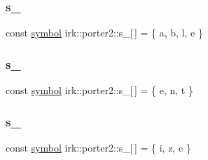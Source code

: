 \mbox{\label{namespaceirk_1_1porter2_ae821034253ce99b614b3e2331a262480}} 
\subsubsection{\texorpdfstring{s\+\_}{s\_12}}
{\footnotesize\ttfamily const \mbox{\hyperlink{namespaceirk_1_1porter2_afd04c4eb58a1dabcf8f3ab2d7e9f9ed5}{symbol}} irk\+::porter2\+::s\+\_\mbox{[}$\,$\mbox{]} = \{ \textquotesingle{}a\textquotesingle{}, \textquotesingle{}b\textquotesingle{}, \textquotesingle{}l\textquotesingle{}, \textquotesingle{}e\textquotesingle{} \}\hspace{0.3cm}{\ttfamily [static]}}

\mbox{\label{namespaceirk_1_1porter2_ae01b59f238865d32969dfe5b7e86d337}} 
\subsubsection{\texorpdfstring{s\+\_}{s\_13}}
{\footnotesize\ttfamily const \mbox{\hyperlink{namespaceirk_1_1porter2_afd04c4eb58a1dabcf8f3ab2d7e9f9ed5}{symbol}} irk\+::porter2\+::s\+\_\mbox{[}$\,$\mbox{]} = \{ \textquotesingle{}e\textquotesingle{}, \textquotesingle{}n\textquotesingle{}, \textquotesingle{}t\textquotesingle{} \}\hspace{0.3cm}{\ttfamily [static]}}

\mbox{\label{namespaceirk_1_1porter2_a492c21408fc2183e9836d76737c56405}} 
\subsubsection{\texorpdfstring{s\+\_}{s\_14}}
{\footnotesize\ttfamily const \mbox{\hyperlink{namespaceirk_1_1porter2_afd04c4eb58a1dabcf8f3ab2d7e9f9ed5}{symbol}} irk\+::porter2\+::s\+\_\mbox{[}$\,$\mbox{]} = \{ \textquotesingle{}i\textquotesingle{}, \textquotesingle{}z\textquotesingle{}, \textquotesingle{}e\textquotesingle{} \}\hspace{0.3cm}{\ttfamily [static]}}

